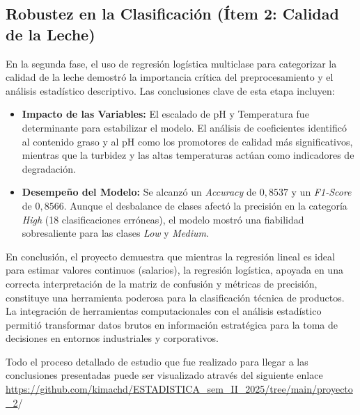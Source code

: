 \documentclass[12pt,a4paper]{article}
\begin{document}
\subsection*{Robustez en la Clasificación (Ítem 2: Calidad de la Leche)}
En la segunda fase, el uso de regresión logística multiclase para categorizar la calidad de la leche demostró la importancia crítica del preprocesamiento y el análisis estadístico descriptivo. Las conclusiones clave de esta etapa incluyen:
\begin{itemize}
	\item \textbf{Impacto de las Variables:} El escalado de pH y Temperatura fue determinante para estabilizar el modelo. El análisis de coeficientes identificó al contenido graso y al pH como los promotores de calidad más significativos, mientras que la turbidez y las altas temperaturas actúan como indicadores de degradación.
	\item \textbf{Desempeño del Modelo:} Se alcanzó un \textit{Accuracy} de $0,8537$ y un \textit{F1-Score} de $0,8566$. Aunque el desbalance de clases afectó la precisión en la categoría \textit{High} (18 clasificaciones erróneas), el modelo mostró una fiabilidad sobresaliente para las clases \textit{Low} y \textit{Medium}.
\end{itemize}

En conclusión, el proyecto demuestra que mientras la regresión lineal es ideal para estimar valores continuos (salarios), la regresión logística, apoyada en una correcta interpretación de la matriz de confusión y métricas de precisión, constituye una herramienta poderosa para la clasificación técnica de productos. La integración de herramientas computacionales con el análisis estadístico permitió transformar datos brutos en información estratégica para la toma de decisiones en entornos industriales y corporativos.

\vspace{2cm}
{Todo el proceso detallado de estudio que fue realizado para llegar a las conclusiones presentadas puede ser visualizado através del siguiente enlace \url{https://github.com/kimachd/ESTADISTICA_sem_II_2025/tree/main/proyecto_2}/}\
\end{document}

